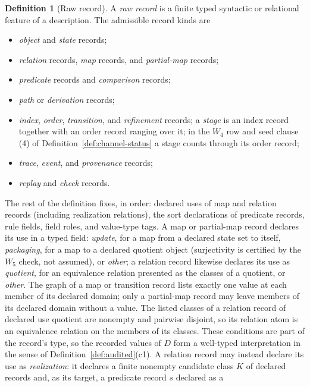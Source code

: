 \documentclass[11pt]{article}
\theoremstyle{definition}
\newtheorem{definition}[theorem]{Definition}
\begin{document}
\begin{definition}[Raw record]\label{def:raw-record}
A \emph{raw record} is a finite typed syntactic or relational feature of a
description. The admissible record kinds are
\begin{itemize}[topsep=2pt,itemsep=1pt]
  \item \emph{object} and \emph{state} records;
  \item \emph{relation} records, \emph{map} records, and \emph{partial-map}
    records;
  \item \emph{predicate} records and \emph{comparison} records;
  \item \emph{path} or \emph{derivation} records;
  \item \emph{index}, \emph{order}, \emph{transition}, and \emph{refinement}
    records; a \emph{stage} is an index record together with an order
    record ranging over it; in the \(W_4\) row and seed clause (4) of Definition~\ref{def:channel-status} a stage
    counts through its order record;
  \item \emph{trace}, \emph{event}, and \emph{provenance} records;
  \item \emph{replay} and \emph{check} records.
\end{itemize}
The rest of the definition fixes, in order: declared uses of map and relation records (including realization relations), the sort declarations of predicate records, rule fields, field roles, and value-type tags.
A map or partial-map record declares its use in a typed field: \emph{update},
for a map from a declared state set to itself, \emph{packaging}, for a map to
a declared quotient object (surjectivity is certified by the \(W_5\) check, not assumed), or \emph{other}; a relation record likewise declares its use
as \emph{quotient}, for an equivalence relation presented as the classes of a
quotient, or \emph{other}. The graph of a map or transition record lists exactly
one value at each member of its declared domain; only a partial-map record may
leave members of its declared domain without a value. The listed classes of a relation record of declared use quotient are nonempty and pairwise disjoint, so its relation atom is an equivalence relation on the members of its classes. These conditions are part of the
record's type, so the recorded values of \(D\) form a well-typed interpretation
in the sense of Definition~\ref{def:audited}(c1). A relation record may instead declare its use as
\emph{realization}: it declares a finite nonempty candidate class \(K\) of
declared records and, as its target, a predicate record \(s\) declared as a

\end{definition}
\end{document}
